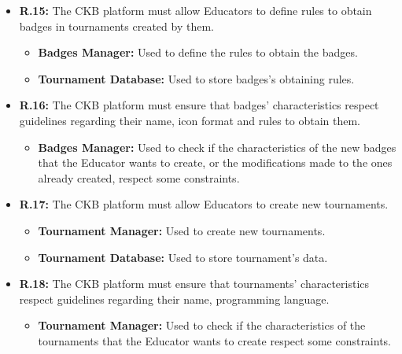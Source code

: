 \documentclass{article}
\begin{document}
{\begin{itemize}
          \begin{itemize}
              \item \textbf{Badges Manager:} Used to update or delete some badges during tournament creation.
              \item \textbf{Tournament Database:}  Used to store the badge's data.
          \end{itemize}
    \item \textbf{R.15:} The CKB platform must allow Educators to define rules to obtain badges in tournaments created by them.
          \begin{itemize}
              \item \textbf{Badges Manager:} Used to define the rules to obtain the badges.
              \item \textbf{Tournament Database:} Used to store badges's obtaining rules.
          \end{itemize}
    \item \textbf{R.16:} The CKB platform must ensure that badges' characteristics respect guidelines regarding their
          name, icon format and rules to obtain them.
          \begin{itemize}
              \item \textbf{Badges Manager:} Used to check if the characteristics of the new badges
              that the Educator wants to create, or the modifications made to the ones already 
              created, respect some constraints.
          \end{itemize}
    \item \textbf{R.17:} The CKB platform must allow Educators to create new tournaments.
          \begin{itemize}
              \item \textbf{Tournament Manager:} Used to create new tournaments.
              \item \textbf{Tournament Database:} Used to store tournament's data.
          \end{itemize}
    \item \textbf{R.18:} The CKB platform must ensure that tournaments' characteristics respect guidelines regarding their
          name, programming language.
          \begin{itemize}
              \item \textbf{Tournament Manager:} Used to check if the characteristics of the tournaments
              that the Educator wants to create respect some constraints.
          \end{itemize}

\end{itemize}}
\end{document}
